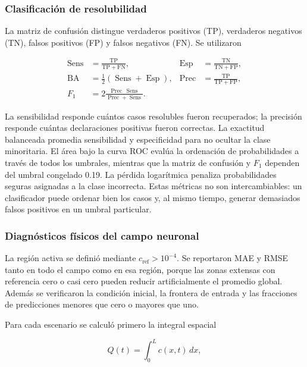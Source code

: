 \documentclass[11pt,a4paper]{article}
\begin{document}
\subsubsection{Clasificación de resolubilidad}

La matriz de confusión distingue verdaderos positivos (TP), verdaderos
negativos (TN), falsos positivos (FP) y falsos negativos (FN). Se utilizaron

\begin{align}
\operatorname{Sens}&=\frac{\mathrm{TP}}{\mathrm{TP}+\mathrm{FN}}, &
\operatorname{Esp}&=\frac{\mathrm{TN}}{\mathrm{TN}+\mathrm{FP}},\\
\operatorname{BA}&=\frac{1}{2}
(\operatorname{Sens}+\operatorname{Esp}), &
\operatorname{Prec}&=\frac{\mathrm{TP}}{\mathrm{TP}+\mathrm{FP}},\\
F_1&=2\frac{\operatorname{Prec}\,\operatorname{Sens}}
{\operatorname{Prec}+\operatorname{Sens}}.
\label{eq:classification-metrics}
\end{align}

La sensibilidad responde cuántos casos resolubles fueron recuperados; la
precisión responde cuántas declaraciones positivas fueron correctas. La
exactitud balanceada promedia sensibilidad y especificidad para no ocultar la
clase minoritaria. El área bajo la curva ROC evalúa la ordenación de
probabilidades a través de todos los umbrales, mientras que la matriz de
confusión y $F_1$ dependen del umbral congelado 0.19. La pérdida logarítmica
penaliza probabilidades seguras asignadas a la clase incorrecta. Estas métricas
no son intercambiables: un clasificador puede ordenar bien los casos y, al
mismo tiempo, generar demasiados falsos positivos en un umbral particular.

\subsubsection{Diagnósticos físicos del campo neuronal}

La región activa se definió mediante $c_{\mathrm{ref}}>10^{-4}$. Se reportaron
MAE y RMSE tanto en todo el campo como en esa región, porque las zonas extensas
con referencia cero o casi cero pueden reducir artificialmente el promedio
global. Además se verificaron la condición inicial, la frontera de entrada y
las fracciones de predicciones menores que cero o mayores que uno.

Para cada escenario se calculó primero la integral espacial

\begin{equation}
Q(t)=\int_0^L c(x,t)\,dx,
\end{equation}
\end{document}
